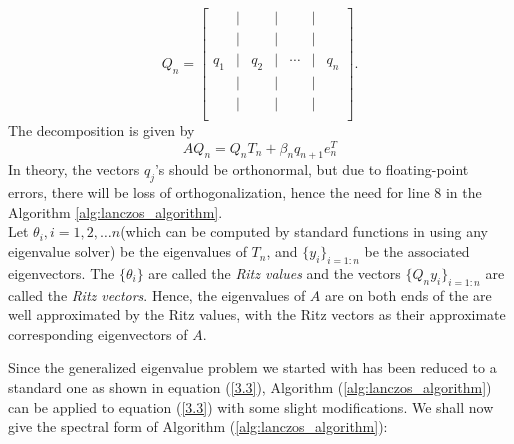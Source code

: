 \documentclass[12pt,gsu,online,openany,singleside,hidelinks]{gsudiss}
\begin{document}
	\[
	Q_n = 
	\begin{bmatrix}
		 & \big| &  & \big| &  & \big| &  \\
		 & \big| &  & \big| &  & \big| &  \\
		 q_1 & \big| & q_2 & \big| & \cdots & \big| & q_n \\
		 & \big| &  & \big| &  & \big| &  \\
		 & \big| &  & \big| &  & \big| &  \\
	\end{bmatrix}.
	\]
The decomposition is given by
\begin{equation}
	AQ_n = Q_nT_n + \beta_{n}q_{n+1}e_n^T
\end{equation}
In theory, the vectors $q_j$'s should be orthonormal, but due to floating-point errors, there will be loss of orthogonalization, hence the need for line 8 in the Algorithm \ref{alg:lanczos_algorithm}.\\
Let $\theta_i, i = 1,2, \ldots n$(which can be computed by standard functions in using any eigenvalue solver) be the eigenvalues of $T_n$, and $\{y_i\}_{i = 1 : n}$ be the associated eigenvectors. The $\{\theta_i\}$ are called the \textit{Ritz values} and the vectors $\{Q_ny_i\}_{i = 1 : n}$ are called the \textit{Ritz vectors}. Hence, the eigenvalues of $A$ are on both ends of the are well approximated by the Ritz values, with the Ritz vectors as their approximate corresponding eigenvectors of $A$.\par
Since the generalized eigenvalue problem we started with has been reduced to a standard one as shown in equation (\ref{3.3}), Algorithm (\ref{alg:lanczos_algorithm}) can be applied to equation (\ref{3.3}) with some slight modifications. We shall now give the spectral form of Algorithm (\ref{alg:lanczos_algorithm}):\\
\end{document}

